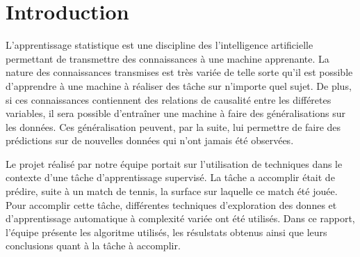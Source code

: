 \section{Introduction}

L'apprentissage statistique est une discipline des l'intelligence artificielle permettant de transmettre des connaissances à une machine apprenante. La nature des connaissances transmises est très variée de telle sorte qu'il est possible d'apprendre à une machine à réaliser des tâche sur n'importe quel sujet. De plus, si ces connaissances contiennent des relations de causalité entre les différetes variables, il sera possible d'entraîner une machine à faire des généralisations sur les données. Ces généralisation peuvent, par la suite, lui permettre de faire des prédictions sur de nouvelles données qui n'ont jamais été observées.

Le projet réalisé par notre équipe portait sur l'utilisation de techniques dans le contexte d'une tâche d'apprentissage supervisé. La tâche a accomplir était de prédire, suite à un match de tennis, la surface sur laquelle ce match été jouée.  Pour accomplir cette tâche, différentes techniques d'exploration des donnes et d'apprentissage automatique à complexité variée ont été utilisés.  Dans ce rapport, l'équipe présente les algoritme utilisés, les résulstats obtenus ainsi que leurs conclusions quant à la tâche à accomplir.


